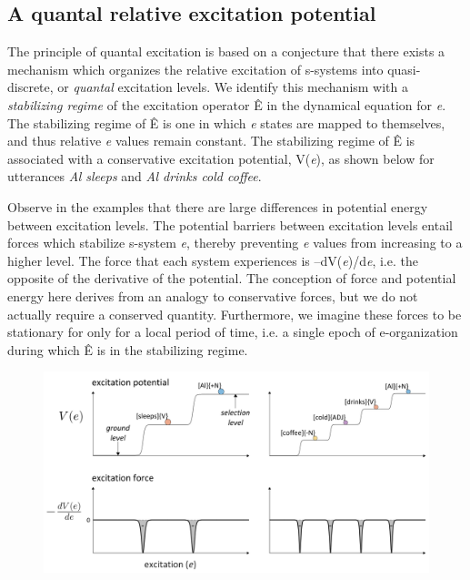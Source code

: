 \subsection{A quantal relative excitation potential}

The principle of quantal excitation is based on a conjecture that there exists a mechanism which organizes the relative excitation of s-systems into quasi-discrete, or \textit{quantal} excitation levels. We identify this mechanism with a \textit{stabilizing regime} of the excitation operator Ê in the dynamical equation for \textit{e}. The stabilizing regime of Ê is one in which \textit{e} states are mapped to themselves, and thus relative \textit{e} values remain constant. The stabilizing regime of Ê is associated with a conservative excitation potential, V(\textit{e}), as shown below for utterances \textit{Al sleeps} and \textit{Al drinks cold coffee}. 

  Observe in the examples that there are large differences in potential energy between excitation levels. The potential barriers between excitation levels entail forces which stabilize s-system \textit{e}, thereby preventing \textit{e} values from increasing to a higher level. The force that each system experiences is –dV(\textit{e})/d\textit{e}, i.e. the opposite of the derivative of the potential. The conception of force and potential energy here derives from an analogy to conservative forces, but we do not actually require a conserved quantity. Furthermore, we imagine these forces to be stationary for only for a local period of time, i.e. a single epoch of e-organization during which Ê is in the stabilizing regime. 

  
\begin{figure}
\includegraphics[width=\textwidth]{figures/Tilsen-img23.png}
\caption{\missingcaption}
\label{fig:}
\end{figure}
 

